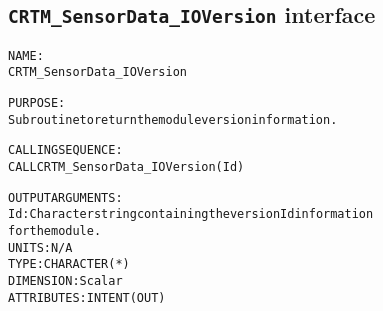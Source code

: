 \subsection{\texttt{CRTM\_SensorData\_IOVersion} interface}
  \label{sec:CRTM_SensorData_IOVersion_interface}
  \begin{alltt}
 
  NAME:
        CRTM_SensorData_IOVersion
 
  PURPOSE:
        Subroutine to return the module version information.
 
  CALLING SEQUENCE:
        CALL CRTM_SensorData_IOVersion( Id )
 
  OUTPUT ARGUMENTS:
        Id:    Character string containing the version Id information
               for the module.
               UNITS:      N/A
               TYPE:       CHARACTER(*)
               DIMENSION:  Scalar
               ATTRIBUTES: INTENT(OUT)
 
  \end{alltt}
